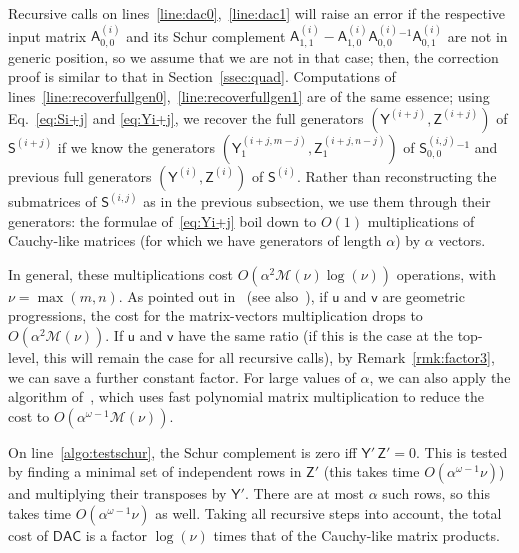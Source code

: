 \documentclass[sigconf]{acmart}
\newcommand{\vu}{\ensuremath{\mathsf{u}}}
\newcommand{\vv}{\ensuremath{\mathsf{v}}}
\newcommand{\mA}{\ensuremath{\mathsf{A}}}
\newcommand{\mS}{\ensuremath{\mathsf{S}}}
\newcommand{\mY}{\ensuremath{\mathsf{Y}}}
\newcommand{\mZ}{\ensuremath{\mathsf{Z}}}
\newcommand{\M}{\ensuremath{\mathscr{M}}}
\newcommand{\mx}{\ensuremath{\nu}}
\newcommand{\DACp}{\ensuremath{\mathsf{DAC}}}
\theoremstyle{acmdefinition}
\begin{document}
Recursive calls on lines~\ref{line:dac0},~\ref{line:dac1} will raise
an error if the respective input matrix ${\mA^{(i)}_{0,0}}$ and its
Schur complement $\mA^{(i)}_{1,1} - \mA^{(i)}_{1,0}
{\mA^{(i)}_{0,0}}{}^{-1} \mA^{(i)}_{0,1}$ are not in generic position,
so we assume that we are not in that case; then, the correction proof
is similar to that in Section~\ref{ssec:quad}.  Computations of
lines~\ref{line:recoverfullgen0},~\ref{line:recoverfullgen1} are of
the same essence; using Eq.~\eqref{eq:Si+j} and \eqref{eq:Yi+j}, we
recover the full generators $(\mY^{(i+j)},\mZ^{(i+j)})$ of
$\mS^{(i+j)}$ if we know the generators
$(\mY^{(i+j,m-j)}_1,\mZ^{(i+j,n-j)}_1)$ of $\mS^{(i,j)}_{0,0}{}^{-1}$
and previous full generators $(\mY^{(i)},\mZ^{(i)})$ of $\mS^{(i)}$.
Rather than reconstructing the submatrices of $\mS^{(i,j)}$ as in the
previous subsection, we use them through their generators: the
formulae of~\eqref{eq:Yi+j} boil down to $O(1)$ multiplications of
Cauchy-like matrices (for which we have generators of length $\alpha$)
by $\alpha$ vectors.

In general, these multiplications cost $O(\alpha^2 \M(\mx) \log(\mx))$
operations, with $\mx=\max(m,n)$.  As pointed out
in~\cite[Theorem~5.3.1]{Pan01} (see also~\cite{ChPa00}), if $\vu$ and
$\vv$ are geometric progressions, the cost for the matrix-vectors
multiplication drops to $O(\alpha^2 \M(\mx))$.  If $\vu$ and $\vv$
have the same ratio (if this is the case at the top-level, this will
remain the case for all recursive calls), by Remark~\ref{rmk:factor3},
we can save a further constant factor.  For large values of $\alpha$,
we can also apply the algorithm of~\cite{BoJeMoSc16}, which uses fast
polynomial matrix multiplication to reduce the cost to
$O(\alpha^{\omega-1} \M(\mx))$.



On line~\ref{algo:testschur}, the Schur complement is zero iff
$\mY'\, \mZ' = 0$. This is tested by finding a minimal set of
independent rows in $\mZ'$ (this takes time
$O(\alpha^{\omega-1} \mx)$) and multiplying their transposes by
${\mY'}$. There are at most $\alpha$ such rows, so this takes time
$O(\alpha^{\omega-1} \mx)$ as well.  Taking all recursive steps into
account, the total cost of $\DACp$ is a factor $\log(\mx)$ times that
of the Cauchy-like matrix products.
\end{document}
